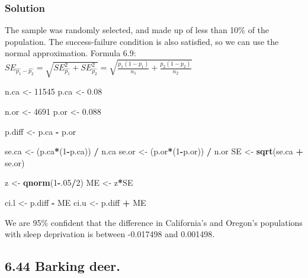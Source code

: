 \documentclass[]{article}
\newenvironment{Shaded}{\begin{snugshade}}{\end{snugshade}}
\newcommand{\KeywordTok}[1]{\textcolor[rgb]{0.13,0.29,0.53}{\textbf{#1}}}
\newcommand{\DecValTok}[1]{\textcolor[rgb]{0.00,0.00,0.81}{#1}}
\newcommand{\FloatTok}[1]{\textcolor[rgb]{0.00,0.00,0.81}{#1}}
\newcommand{\StringTok}[1]{\textcolor[rgb]{0.31,0.60,0.02}{#1}}
\newcommand{\OperatorTok}[1]{\textcolor[rgb]{0.81,0.36,0.00}{\textbf{#1}}}
\newcommand{\NormalTok}[1]{#1}
\begin{document}
\subsubsection{Solution}\label{solution-9}

The sample was randomly selected, and made up of less than 10\% of the
population. The success-failure condition is also satisfied, so we can
use the normal approximation. Formula 6.9:
\(SE_{\hat{p_1}-\hat{p_2}} = \sqrt{SE_{\hat{p_1}}^2 + SE_{\hat{p_2}}^2} = \sqrt{\frac{p_1(1-p_1)}{n_1}+\frac{p_2(1-p_2)}{n_2}}\)

\begin{Shaded}
\begin{Highlighting}[]
\NormalTok{n.ca <-}\StringTok{ }\DecValTok{11545}
\NormalTok{p.ca <-}\StringTok{ }\FloatTok{0.08}

\NormalTok{n.or <-}\StringTok{ }\DecValTok{4691}
\NormalTok{p.or <-}\StringTok{ }\FloatTok{0.088}

\NormalTok{p.diff <-}\StringTok{ }\NormalTok{p.ca }\OperatorTok{-}\StringTok{ }\NormalTok{p.or}

\NormalTok{se.ca <-}\StringTok{ }\NormalTok{(p.ca}\OperatorTok{*}\NormalTok{(}\DecValTok{1}\OperatorTok{-}\NormalTok{p.ca)) }\OperatorTok{/}\StringTok{ }\NormalTok{n.ca}
\NormalTok{se.or <-}\StringTok{ }\NormalTok{(p.or}\OperatorTok{*}\NormalTok{(}\DecValTok{1}\OperatorTok{-}\NormalTok{p.or)) }\OperatorTok{/}\StringTok{ }\NormalTok{n.or}
\NormalTok{SE <-}\StringTok{ }\KeywordTok{sqrt}\NormalTok{(se.ca }\OperatorTok{+}\StringTok{ }\NormalTok{se.or)}

\NormalTok{z <-}\StringTok{ }\KeywordTok{qnorm}\NormalTok{(}\DecValTok{1}\OperatorTok{-}\NormalTok{.}\DecValTok{05}\OperatorTok{/}\DecValTok{2}\NormalTok{)}
\NormalTok{ME <-}\StringTok{ }\NormalTok{z}\OperatorTok{*}\NormalTok{SE}

\NormalTok{ci.l <-}\StringTok{ }\NormalTok{p.diff }\OperatorTok{-}\StringTok{ }\NormalTok{ME}
\NormalTok{ci.u <-}\StringTok{ }\NormalTok{p.diff }\OperatorTok{+}\StringTok{ }\NormalTok{ME}
\end{Highlighting}
\end{Shaded}

We are 95\% confident that the difference in California's and Oregon's
populations with sleep deprivation is between -0.017498 and 0.001498.

\subsection{6.44 Barking deer.}\label{barking-deer.}
\end{document}
